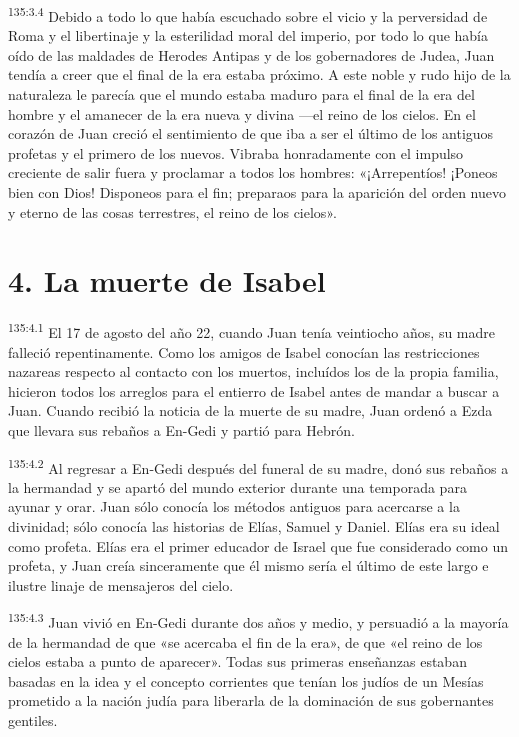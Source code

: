 \par 
\textsuperscript{135:3.4} Debido a todo lo que había escuchado sobre el vicio y la perversidad de Roma y el libertinaje y la esterilidad moral del imperio, por todo lo que había oído de las maldades de Herodes Antipas y de los gobernadores de Judea, Juan tendía a creer que el final de la era estaba próximo. A este noble y rudo hijo de la naturaleza le parecía que el mundo estaba maduro para el final de la era del hombre y el amanecer de la era nueva y divina ---el reino de los cielos. En el corazón de Juan creció el sentimiento de que iba a ser el último de los antiguos profetas y el primero de los nuevos. Vibraba honradamente con el impulso creciente de salir fuera y proclamar a todos los hombres: «¡Arrepentíos! ¡Poneos bien con Dios! Disponeos para el fin; preparaos para la aparición del orden nuevo y eterno de las cosas terrestres, el reino de los cielos».

\section*{4. La muerte de Isabel}
\par 
\textsuperscript{135:4.1} El 17 de agosto del año 22, cuando Juan tenía veintiocho años, su madre falleció repentinamente. Como los amigos de Isabel conocían las restricciones nazareas respecto al contacto con los muertos, incluídos los de la propia familia, hicieron todos los arreglos para el entierro de Isabel antes de mandar a buscar a Juan. Cuando recibió la noticia de la muerte de su madre, Juan ordenó a Ezda que llevara sus rebaños a En-Gedi y partió para Hebrón.

\par 
\textsuperscript{135:4.2} Al regresar a En-Gedi después del funeral de su madre, donó sus rebaños a la hermandad y se apartó del mundo exterior durante una temporada para ayunar y orar. Juan sólo conocía los métodos antiguos para acercarse a la divinidad; sólo conocía las historias de Elías, Samuel y Daniel. Elías era su ideal como profeta. Elías era el primer educador de Israel que fue considerado como un profeta, y Juan creía sinceramente que él mismo sería el último de este largo e ilustre linaje de mensajeros del cielo.

\par 
\textsuperscript{135:4.3} Juan vivió en En-Gedi durante dos años y medio, y persuadió a la mayoría de la hermandad de que «se acercaba el fin de la era», de que «el reino de los cielos estaba a punto de aparecer». Todas sus primeras enseñanzas estaban basadas en la idea y el concepto corrientes que tenían los judíos de un Mesías prometido a la nación judía para liberarla de la dominación de sus gobernantes gentiles.

